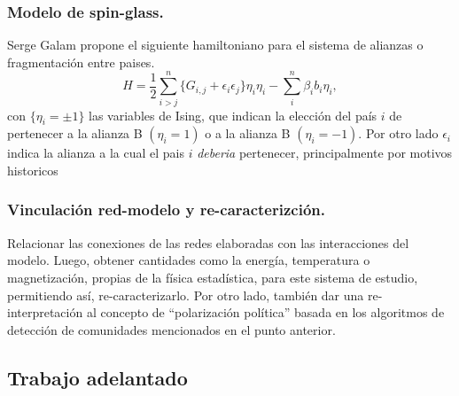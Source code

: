 \documentclass{proyectotesis}
\begin{document}

%
%

\subsubsection{Modelo de spin-glass.} Serge Galam propone el siguiente hamiltoniano para el sistema de alianzas o fragmentación entre paises.
\begin{equation}
    H = \frac{1}{2} \sum_{i>j}^n \{G_{i,j} + \epsilon_i \epsilon_j\}\eta_i \eta_i - \sum_i^n \beta_i b_i \eta_i
,\end{equation}
con $\{\eta_i = \pm 1 \}$ las variables de Ising, que indican la elección del país $i$ de pertenecer a la alianza B $(\eta_i = 1)$ o a la alianza B $(\eta_i = -1)$. Por otro lado $\epsilon_i$ indica la alianza a la cual el pais $i$ \textit{deberia} pertenecer, principalmente por motivos historicos

\subsubsection{Vinculación red-modelo y re-caracterizción.} Relacionar las conexiones de las redes elaboradas con las interacciones del modelo. Luego, obtener cantidades como la energía, temperatura o magnetización, propias de la física estadística, para este sistema de estudio, permitiendo así, re-caracterizarlo. Por otro lado, también dar una re-interpretación al concepto de ``polarización política''  basada en los algoritmos de detección de comunidades mencionados en el punto anterior. 
\subsection{Trabajo adelantado}
\end{document}
